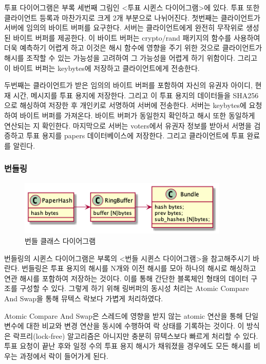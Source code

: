 \documentclass[10pt,a4paper,left=15mm,right=15mm,top=20mm,bottom=20mm]{article}
\begin{document}
    투표 다이어그램은 부록 세번째 그림인 <투표 시퀸스 다이어그램>에 있다. 투표 또한 클라이언트 등록과 마찬가지로 크게 2개 부분으로 나뉘어진다. 첫번째는 클라이언트가 서버에 임의의 바이트 버퍼를 요구한다. 서버는 클라이언트에게 완전히 무작위로 생성된 바이트 버퍼를 제공한다. 이 바이트 버퍼는 crypto/rand 패키지의 함수를 사용하여 더욱 예측하기 어렵게 하고 이것은 해시 함수에 영향을 주기 위한 것으로 클라이언트가 해시를 조작할 수 있는 가능성을 고려하여 그 가능성을 어렵게 하기 위함이다. 그리고 이 바이트 버퍼는 keybytes에 저장하고 클라이언트에게 전송한다.

    두번째는 클라이언트가 받은 임의의 바이트 버퍼를 포함하여 자신의 유권자 아이디, 현재 시간, 메시지를 투표 용지에 저장한다. 그리고 이 투표 용지의 데이터들을 SHA256으로 해싱하여 저장한 후 개인키로 서명하여 서버에 전송한다. 서버는 keybytes에 요청하여 바이트 버퍼를 가져온다. 바이트 버퍼가 동일한지 확인하고 해시 또한 동일하게 연산되는 지 확인한다. 마지막으로 서버는 voters에서 유권자 정보를 받아서 서명을 검증하고 투표 용지를 papers 데이터베이스에 저장한다. 그리고 클라이언트에 투표 완료를 알린다.

    \subsubsection{번들링}

    \begin{figure}[h]
        \begin{center}
            \includegraphics[width=10cm]{bundle}
            \caption{번들 클래스 다이어그램}
        \end{center}
    \end{figure}

    번들링의 시퀸스 다이어그램은 부록의 <번들 시퀸스 다이어그램>을 참고해주시기 바란다. 번들링은 투표 용지의 해시를 N개와 이전 해시를 모아 하나의 해시로 해싱하고 연관 해시를 포함하여 저장하는 것이다. 이를 통해 간단한 블록체인 형태의 데이터 구조를 구성할 수 있다. 그렇게 하기 위해 링버퍼의 동시성 처리는 Atomic Compare And Swap을 통해 뮤텍스 락보다 가볍게 처리하였다.

    Atomic Compare And Swap은 스레드에 영향을 받지 않는 atomic 연산을 통해 단일 변수에 대한 비교와 변경 연산을 동시에 수행하여 락 상태를 기록하는 것이다. 이 방식은 락프리(lock-free) 알고리즘은 아니지만 충분히 뮤텍스보다 빠르게 처리할 수 있다. 투표 요청이 끝난 후와 일정 수의 투표 용지 해시가 채워졌을 경우에도 모든 해시를 비우는 과정에서 락이 들어가게 된다. 
\end{document}
